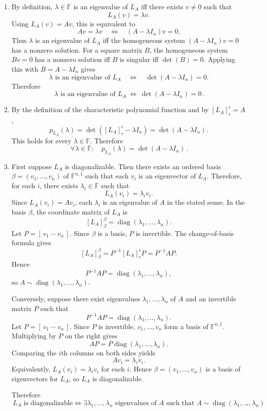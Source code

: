 \documentclass[12pt]{article}
\newcommand{\F}{\mathbb{F}}
\DeclareMathOperator{\diag}{diag}
\begin{document}
\begin{enumerate}[label=(\alph*)]
\item By definition, $\lambda\in\F$ is an eigenvalue of $L_A$ iff there exists $v\neq 0$ such that
\[
L_A(v)=\lambda v.
\]
Using $L_A(v)=Av$, this is equivalent to
\[
Av=\lambda v
\quad\Longleftrightarrow\quad
(A-\lambda I_n)v=0.
\]
Thus $\lambda$ is an eigenvalue of $L_A$ iff the homogeneous system $(A-\lambda I_n)v=0$ has a nonzero solution. For a square matrix $B$, the homogeneous system $Bv=0$ has a nonzero solution iff $B$ is singular iff $\det(B)=0$. Applying this with $B=A-\lambda I_n$ gives
\[
\lambda\text{ is an eigenvalue of }L_A
\quad\Longleftrightarrow\quad
\det(A-\lambda I_n)=0.
\]
Therefore
\[
\boxed{\,\lambda \text{ is an eigenvalue of }L_A\ \Longleftrightarrow\ \det(A-\lambda I_n)=0\,}.
\]

\item By the definition of the characteristic polynomial function and by $[L_A]_{\epsilon}^{\epsilon}=A$,
\[
p_{L_A}(\lambda)
=\det([L_A]_{\epsilon}^{\epsilon}-\lambda I_n)
=\det(A-\lambda I_n).
\]
This holds for every $\lambda\in\F$. Therefore
\[
\boxed{\,\forall\lambda\in\F:\quad p_{L_A}(\lambda)=\det(A-\lambda I_n)\,}.
\]

\newpage
\item First suppose $L_A$ is diagonalizable. Then there exists an ordered basis $\beta=(v_1,\dots,v_n)$ of $\F^{n,1}$ such that each $v_i$ is an eigenvector of $L_A$. Therefore, for each $i$, there exists $\lambda_i\in\F$ such that
\[
L_A(v_i)=\lambda_i v_i.
\]
Since $L_A(v_i)=Av_i$, each $\lambda_i$ is an eigenvalue of $A$ in the stated sense. In the basis $\beta$, the coordinate matrix of $L_A$ is
\[
[L_A]_{\beta}^{\beta}=\diag(\lambda_1,\dots,\lambda_n).
\]
Let $P=[\,v_1\ \cdots\ v_n\,]$. Since $\beta$ is a basis, $P$ is invertible. The change-of-basis formula gives
\[
[L_A]_{\beta}^{\beta}=P^{-1}[L_A]_{\epsilon}^{\epsilon}P=P^{-1}AP.
\]
Hence
\[
P^{-1}AP=\diag(\lambda_1,\dots,\lambda_n),
\]
so $A\sim\diag(\lambda_1,\dots,\lambda_n)$.

Conversely, suppose there exist eigenvalues $\lambda_1,\dots,\lambda_n$ of $A$ and an invertible matrix $P$ such that
\[
P^{-1}AP=\diag(\lambda_1,\dots,\lambda_n).
\]
Let $P=[\,v_1\ \cdots\ v_n\,]$. Since $P$ is invertible, $v_1,\dots,v_n$ form a basis of $\F^{n,1}$. Multiplying by $P$ on the right gives
\[
AP=P\diag(\lambda_1,\dots,\lambda_n).
\]
Comparing the $i$th columns on both sides yields
\[
Av_i=\lambda_i v_i.
\]
Equivalently, $L_A(v_i)=\lambda_i v_i$ for each $i$. Hence $\beta=(v_1,\dots,v_n)$ is a basis of eigenvectors for $L_A$, so $L_A$ is diagonalizable.

Therefore
\[
\boxed{\,L_A\text{ is diagonalizable}
\Longleftrightarrow
\exists\lambda_1,\dots,\lambda_n\text{ eigenvalues of }A\text{ such that }A\sim\diag(\lambda_1,\dots,\lambda_n)\,}.
\]
\end{enumerate}
\end{document}

